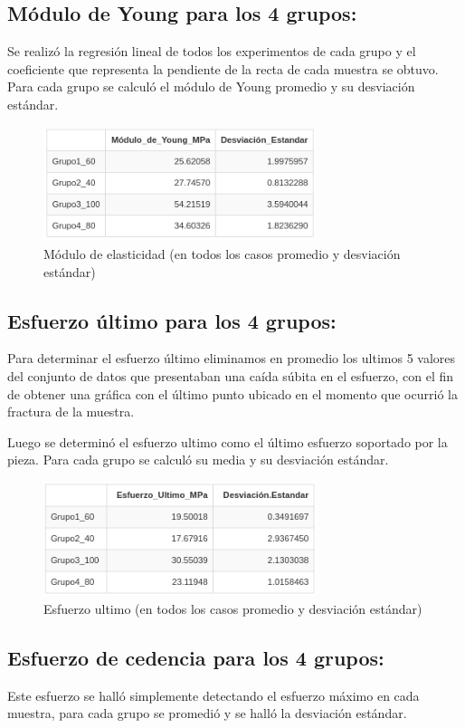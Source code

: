 \documentclass[journal,transmag]{IEEEtran}
\begin{document}
	\subsection{Módulo de Young para los 4 grupos:  }
Se realizó la regresión lineal de todos los experimentos de cada grupo y el coeficiente que representa la pendiente de la recta de cada muestra se obtuvo. Para cada grupo se calculó el módulo de Young promedio y su desviación estándar. 

	\begin{figure}[!h]
		\center
		\includegraphics[width=8cm]{imagenes/young.png}
		\caption{Módulo de elasticidad (en todos los casos promedio y desviación estándar) }
		\label{5}
	\end{figure}
	
	\subsection{Esfuerzo último para los 4 grupos:  }
Para determinar el esfuerzo último eliminamos en promedio los ultimos 5 valores del conjunto de datos que presentaban una caída súbita en el esfuerzo, con el fin de obtener una gráfica con el último punto ubicado en el momento que ocurrió la fractura de la muestra. 

Luego se determinó el esfuerzo ultimo como el último esfuerzo soportado por la pieza. Para cada grupo se calculó su media y su desviación estándar. 

	\begin{figure}[!h]
		\center
		\includegraphics[width=8cm]{imagenes/ultimo.png}
		\caption{Esfuerzo ultimo (en todos los casos promedio y desviación estándar) }
		\label{6}
	\end{figure}
	
	
\subsection{Esfuerzo de cedencia para los 4 grupos: }
Este esfuerzo se halló simplemente detectando el esfuerzo máximo en cada muestra, para cada grupo se promedió y se halló la desviación estándar.  
\end{document}
